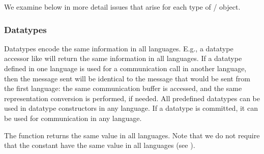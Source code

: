 We examine below in more detail issues that arise for each type of
\MPI/ object.

\subsubsection{Datatypes}
\label{sec:misc-datatypes}

Datatypes encode the same information in all languages.  E.g., a
datatype accessor like  will return the
same information in all languages.
If a datatype defined in
one language is used for a communication call in another language, then the
message sent will
be identical to the message that would be sent from the first language: the
same
communication buffer is accessed, and the same representation
conversion is performed, if needed.
All predefined
datatypes can be used in datatype constructors in any language. If
a datatype is committed, it can be used for
communication in any language.

The function  returns the same value in
all languages.  Note that we do not require that the
constant  have the same value in all languages (see
).

